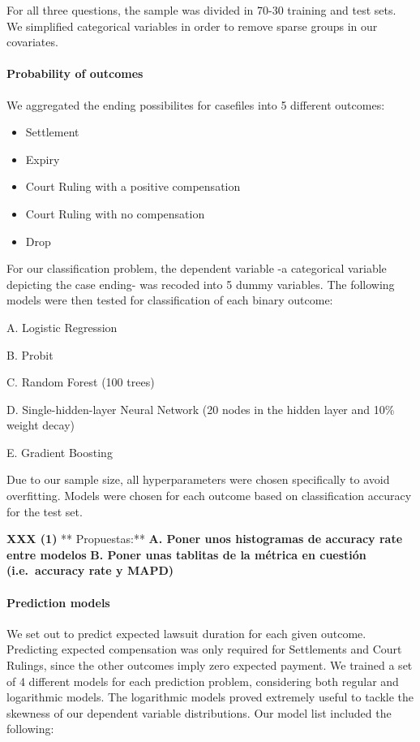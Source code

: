 \documentclass[]{article}
\let\oldparagraph\paragraph
\renewcommand{\paragraph}[1]{\oldparagraph{#1}\mbox{}}
\begin{document}
For all three questions, the sample was divided in 70-30 training and
test sets. We simplified categorical variables in order to remove sparse
groups in our covariates.

\paragraph{Probability of outcomes}\label{probability-of-outcomes}

We aggregated the ending possibilites for casefiles into 5 different
outcomes:

\begin{itemize}
\item
  Settlement
\item
  Expiry
\item
  Court Ruling with a positive compensation
\item
  Court Ruling with no compensation
\item
  Drop
\end{itemize}

For our classification problem, the dependent variable -a categorical
variable depicting the case ending- was recoded into 5 dummy variables.
The following models were then tested for classification of each binary
outcome:

A. Logistic Regression

B. Probit

C. Random Forest (100 trees)

D. Single-hidden-layer Neural Network (20 nodes in the hidden layer and
10\% weight decay)

E. Gradient Boosting

Due to our sample size, all hyperparameters were chosen specifically to
avoid overfitting. Models were chosen for each outcome based on
classification accuracy for the test set.

\textbf{XXX (1) } ** Propuestas:** \textbf{A. Poner unos histogramas de
accuracy rate entre modelos } \textbf{B. Poner unas tablitas de la
métrica en cuestión (i.e.~accuracy rate y MAPD) }

\paragraph{Prediction models}\label{prediction-models}

We set out to predict expected lawsuit duration for each given outcome.
Predicting expected compensation was only required for Settlements and
Court Rulings, since the other outcomes imply zero expected payment. We
trained a set of 4 different models for each prediction problem,
considering both regular and logarithmic models. The logarithmic models
proved extremely useful to tackle the skewness of our dependent variable
distributions. Our model list included the following:
\end{document}
